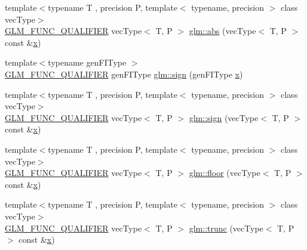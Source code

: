 \begin{DoxyCompactItemize}
\item 
{\footnotesize template$<$typename T , precision P, template$<$ typename, precision $>$ class vec\+Type$>$ }\\\mbox{\hyperlink{setup_8hpp_a33fdea6f91c5f834105f7415e2a64407}{G\+L\+M\+\_\+\+F\+U\+N\+C\+\_\+\+Q\+U\+A\+L\+I\+F\+I\+ER}} vec\+Type$<$ T, P $>$ \mbox{\hyperlink{group__core__func__common_ga4e8c1187dff84385308245090d440b35}{glm\+::abs}} (vec\+Type$<$ T, P $>$ const \&\mbox{\hyperlink{glad_8h_a92d0386e5c19fb81ea88c9f99644ab1d}{x}})
\item 
{\footnotesize template$<$typename gen\+F\+I\+Type $>$ }\\\mbox{\hyperlink{setup_8hpp_a33fdea6f91c5f834105f7415e2a64407}{G\+L\+M\+\_\+\+F\+U\+N\+C\+\_\+\+Q\+U\+A\+L\+I\+F\+I\+ER}} gen\+F\+I\+Type \mbox{\hyperlink{namespaceglm_a4cb99d6c397185120f49d1d56cf45b84}{glm\+::sign}} (gen\+F\+I\+Type \mbox{\hyperlink{glad_8h_a92d0386e5c19fb81ea88c9f99644ab1d}{x}})
\item 
{\footnotesize template$<$typename T , precision P, template$<$ typename, precision $>$ class vec\+Type$>$ }\\\mbox{\hyperlink{setup_8hpp_a33fdea6f91c5f834105f7415e2a64407}{G\+L\+M\+\_\+\+F\+U\+N\+C\+\_\+\+Q\+U\+A\+L\+I\+F\+I\+ER}} vec\+Type$<$ T, P $>$ \mbox{\hyperlink{group__core__func__common_gac3446b4138e0b8757561c07cd19f084d}{glm\+::sign}} (vec\+Type$<$ T, P $>$ const \&\mbox{\hyperlink{glad_8h_a92d0386e5c19fb81ea88c9f99644ab1d}{x}})
\item 
{\footnotesize template$<$typename T , precision P, template$<$ typename, precision $>$ class vec\+Type$>$ }\\\mbox{\hyperlink{setup_8hpp_a33fdea6f91c5f834105f7415e2a64407}{G\+L\+M\+\_\+\+F\+U\+N\+C\+\_\+\+Q\+U\+A\+L\+I\+F\+I\+ER}} vec\+Type$<$ T, P $>$ \mbox{\hyperlink{group__core__func__common_ga568b822b78f045f77c3325e165b44d5d}{glm\+::floor}} (vec\+Type$<$ T, P $>$ const \&\mbox{\hyperlink{glad_8h_a92d0386e5c19fb81ea88c9f99644ab1d}{x}})
\item 
{\footnotesize template$<$typename T , precision P, template$<$ typename, precision $>$ class vec\+Type$>$ }\\\mbox{\hyperlink{setup_8hpp_a33fdea6f91c5f834105f7415e2a64407}{G\+L\+M\+\_\+\+F\+U\+N\+C\+\_\+\+Q\+U\+A\+L\+I\+F\+I\+ER}} vec\+Type$<$ T, P $>$ \mbox{\hyperlink{group__core__func__common_ga634cdbf8b37edca03f2248450570fd54}{glm\+::trunc}} (vec\+Type$<$ T, P $>$ const \&\mbox{\hyperlink{glad_8h_a92d0386e5c19fb81ea88c9f99644ab1d}{x}})
\item 

\end{DoxyCompactItemize}
